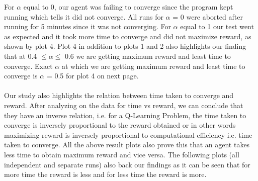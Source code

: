 \documentclass[conference]{IEEEtran}
\begin{document}
For $\alpha$ equal to 0, our agent was failing to converge since the program kept running which tells it did not converge. All runs for $\alpha$ = 0 were aborted after running for 5 minutes since it was not converging. For $\alpha$ equal to 1 our test went as expected and it took more time to converge and did not maximize reward, as shown by plot 4. Plot 4 in addition to plots 1 and 2 also highlights our finding that at 0.4 $ \leq \alpha \leq$ 0.6 we are getting maximum reward and least time to converge. Exact $\alpha$ at which we are getting maximum reward and least time to converge is $\alpha$ = 0.5 for plot 4 on next page. \\ \\ Our study also highlights the relation between time taken to converge and reward. After analyzing on the data for time vs reward, we can conclude that they have an inverse relation, i.e. for a Q-Learning Problem, the time taken to converge is inversely proportional to the reward obtained or in other words maximizing reward is inversely proportional to computational efficiency i.e. time taken to converge. All the above result plots also prove this that an agent takes less time to obtain maximum reward and vice versa. The following plots (all independent and separate runs) also back our findings as it can be seen that for more time the reward is less and for less time the reward is more. 
\end{document}
